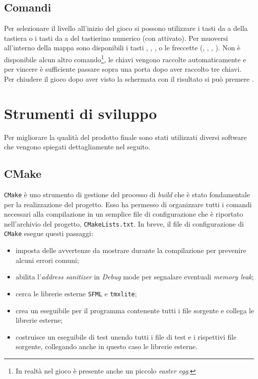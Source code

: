 \documentclass{article}
\begin{document}
\subsection{Comandi}
Per selezionare il livello all'inizio del gioco si possono utilizzare i tasti da  a  della tastiera o i tasti da  a  del tastierino numerico (con  attivato). Per muoversi all'interno della mappa sono disponibili i tasti , , ,  o le freccette (\keys{\arrowkeyup}, \keys{\arrowkeyleft}, \keys{\arrowkeydown}, \keys{\arrowkeyright}). Non è disponibile alcun altro comando\footnote{In realtà nel gioco è presente anche un piccolo \textit{easter egg}.}, le chiavi vengono raccolte automaticamente e per vincere è sufficiente passare sopra una porta dopo aver raccolto tre chiavi. Per chiudere il gioco dopo aver visto la schermata con il risultato si può premere .

\section{Strumenti di sviluppo}\label{section:tools}
Per migliorare la qualità del prodotto finale sono stati utilizzati diversi software che vengono spiegati dettagliamente nel seguito.
\subsection{CMake}
\verb|CMake| è uno strumento di gestione del processo di \textit{build} che è stato fondamentale per la realizzazione del progetto. Esso ha permesso di organizzare tutti i comandi necessari alla compilazione in un semplice file di configurazione che è riportato nell'archivio del progetto, \verb|CMakeLists.txt|. In breve, il file di configurazione di \verb|CMake| esegue questi passaggi:
\begin{itemize}
    \item imposta delle avvertenze da mostrare durante la compilazione per prevenire alcuni errori comuni;
    \item abilita l'\textit{address sanitizer} in \textit{Debug} mode per segnalare eventuali \textit{memory leak};
    \item cerca le librerie esterne \verb|SFML| e \verb|tmxlite|;
    \item crea un eseguibile per il programma contenente tutti i file sorgente e collega le librerie esterne;
    \item costruisce un eseguibile di test unendo tutti i file di test e i rispettivi file sorgente, collegando anche in questo caso le librerie esterne.
\end{itemize}
\end{document}
